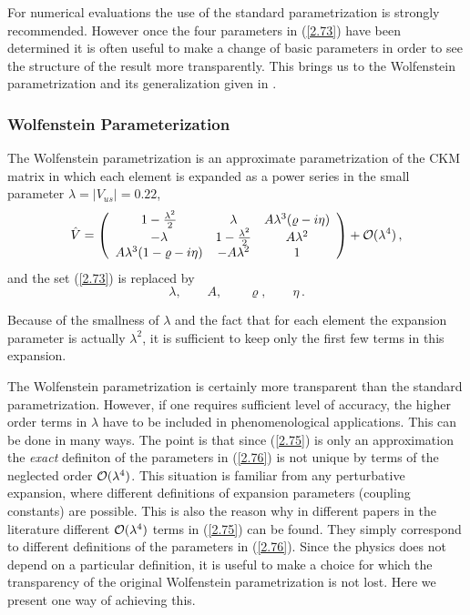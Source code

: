 \documentclass[12pt,rotate]{article}
\newcommand{\ord}{{\cal O}}
\begin{document}
\begin{itemize}
For numerical evaluations the use of the standard parametrization
is strongly recommended. However once the four parameters in
(\ref{2.73}) have been determined it is often useful to make
a change of basic parameters in order to see the structure of
the result more transparently. This brings us to the Wolfenstein
parametrization \cite{WO} and its generalization given in 
\cite{BLO}.

\subsubsection{Wolfenstein Parameterization }\label{Wolf-Par}
 The Wolfenstein parametrization 
is an approximate parametrization of the CKM matrix in which
each element is expanded as a power series in the small parameter
$\lambda=| V_{us}|=0.22$,
\begin{equation}\label{2.75} 
\hat V=
\left(\begin{array}{ccc}
1-{\lambda^2\over 2}&\lambda&A\lambda^3(\varrho-i\eta)\\ -\lambda&
1-{\lambda^2\over 2}&A\lambda^2\\ A\lambda^3(1-\varrho-i\eta)&-A\lambda^2&
1\end{array}\right)
+\ord(\lambda^4)\,,
\end{equation}
and the set (\ref{2.73}) is replaced by
\begin{equation}\label{2.76}
\lambda, \qquad A, \qquad \varrho, \qquad \eta \, .
\end{equation}

Because of the
smallness of $\lambda$ and the fact that for each element 
the expansion parameter is actually
$\lambda^2$, it is sufficient to keep only the first few terms
in this expansion. 

The Wolfenstein parametrization is certainly more transparent than
the standard parametrization. However, if one requires sufficient 
level of accuracy, the higher order terms in $\lambda$ have to
be included in phenomenological applications.
This can be done in many ways.
The
point is that since (\ref{2.75}) is only an approximation the {\em exact}
definiton of the parameters in (\ref{2.76}) is not unique by terms of the 
neglected order
${\cal O}(\lambda^4)$. 
This situation is familiar from any perturbative expansion, where
different definitions of expansion parameters (coupling constants) 
are possible.
This is also the reason why in different papers in the
literature different ${\cal O}(\lambda^4)$ terms in (\ref{2.75})
 can be found. They simply
correspond to different definitions of the parameters in (\ref{2.76}).
Since the physics does not depend on a particular definition, it
is useful to make a choice for which the transparency of the original
Wolfenstein parametrization is not lost. Here we present one
way of achieving this.


\end{itemize}
\end{document}
